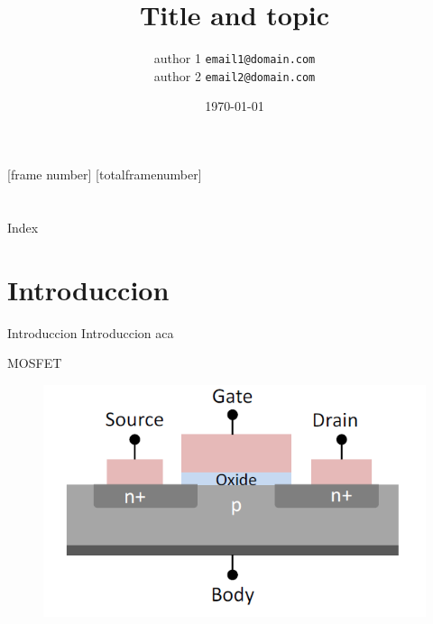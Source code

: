 \documentclass[handout,t]{beamer}
\title[Topic]{Title and topic}
\author[if you want put here who aro you going to present or the name organization]
{author 1 \texttt{email1@domain.com} \\author 2 \texttt{email2@domain.com}\\}
\date{\today}
\begin{document}
[frame number]
[totalframenumber]

\frame{\titlepage}
\section[]{}
\begin{frame}{Index}
  \tableofcontents
\end{frame}
\section{Introduccion}
\begin{frame}{Introduccion}
	Introduccion aca
\end{frame}


\begin{frame}{MOSFET}
	\begin{figure}[!ht]
		\centering
		\includegraphics[width= 0.8\linewidth]{../figures/MOSFET.png}
		\label{fig:mosfet}
	\end{figure}
\end{frame}
\end{document}

